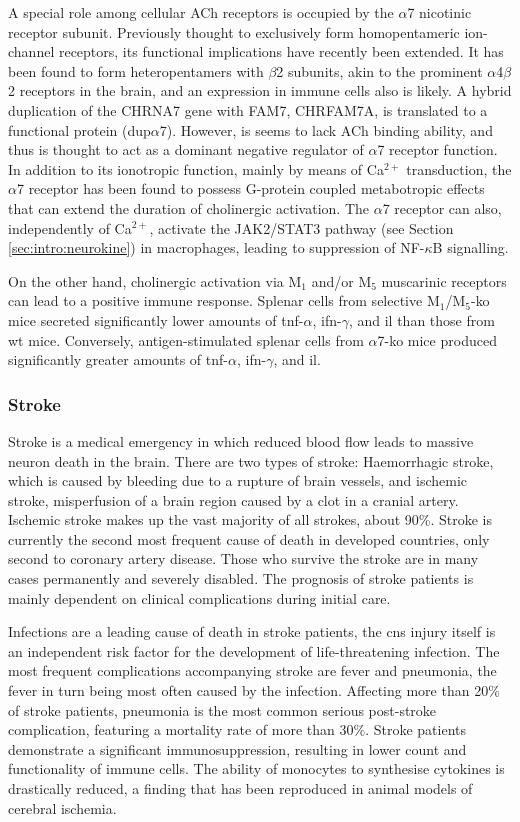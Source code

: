 A special role among cellular ACh receptors is occupied by the $\alpha$7 nicotinic receptor subunit. Previously thought to exclusively form homopentameric ion-channel receptors, its functional implications have recently been extended. It has been found to form heteropentamers with $\beta$2 subunits, akin to the prominent $\alpha$4$\beta$2 receptors in the brain, and an expression in immune cells also is likely. A hybrid duplication of the CHRNA7 gene with FAM7, CHRFAM7A, is translated to a functional protein (dup$\alpha$7). However, is seems to lack ACh binding ability, and thus is thought to act as a dominant negative regulator of $\alpha$7 receptor function. In addition to its ionotropic function, mainly by means of Ca$^{2+}$ transduction, the $\alpha$7 receptor has been found to possess G-protein coupled metabotropic effects that can extend the duration of cholinergic activation. The $\alpha$7 receptor can also, independently of Ca$^{2+}$, activate the JAK2/STAT3 pathway (see Section \ref{sec:intro:neurokine}) in macrophages, leading to suppression of NF-$\kappa$B signalling.

On the other hand, cholinergic activation via M$_1$ and/or M$_5$ muscarinic receptors can lead to a positive immune response. Splenar cells from selective M$_1$/M$_5$-\ac{ko} mice secreted significantly lower amounts of \ac{tnf}-$\alpha$, \ac{ifn}-$\gamma$, and \ac{il} than those from \ac{wt} mice. Conversely, antigen-stimulated splenar cells from $\alpha$7-\ac{ko} mice produced significantly greater amounts of \ac{tnf}-$\alpha$, \ac{ifn}-$\gamma$, and \ac{il}.

\subsubsection{Stroke} 
Stroke is a medical emergency in which reduced blood flow leads to massive neuron death in the brain. There are two types of stroke: Haemorrhagic stroke, which is caused by bleeding due to a rupture of brain vessels, and ischemic stroke, misperfusion of a brain region caused by a clot in a cranial artery. Ischemic stroke makes up the vast majority of all strokes, about 90\%. Stroke is currently the second most frequent cause of death in developed countries, only second to coronary artery disease. Those who survive the stroke are in many cases permanently and severely disabled. The prognosis of stroke patients is mainly dependent on clinical complications during initial care.

Infections are a leading cause of death in stroke patients, the \ac{cns} injury itself is an independent risk factor for the development of life-threatening infection. The most frequent complications accompanying stroke are fever and pneumonia, the fever in turn being most often caused by the infection. Affecting more than 20\% of stroke patients, pneumonia is the most common serious post-stroke complication, featuring a mortality rate of more than 30\%\cite{Meisel2005}. Stroke patients demonstrate a significant immunosuppression, resulting in lower count and functionality of immune cells. The ability of monocytes to synthesise cytokines is drastically reduced, a finding that has been reproduced in animal models of cerebral ischemia.

